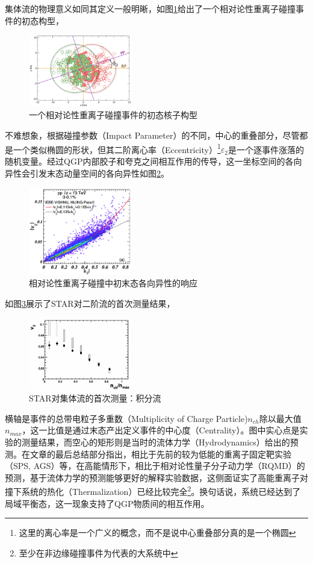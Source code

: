 \documentclass[%
 reprint,
 amsmath,amssymb,
 aps,
]{revtex4-1}
\begin{document}
集体流的物理意义如同其定义一般明晰，如图\ref{fig:Config}给出了一个相对论性重离子碰撞事件的初态构型，
\begin{figure}[htbp]
    \includegraphics[width=0.4\textwidth]{Plots/Config.png}
    \caption{\label{fig:Config}一个相对论性重离子碰撞事件的初态核子构型}
\end{figure}
不难想象，根据碰撞参数（Impact Parameter）的不同，中心的重叠部分，尽管都是一个类似椭圆的形状，但其二阶离心率（Eccentricity）\footnote{这里的离心率是一个广义的概念，而不是说中心重叠部分真的是一个椭圆}$\varepsilon_2$是一个逐事件涨落的随机变量。经过QGP内部胶子和夸克之间相互作用的传导，这一坐标空间的各向异性会引发末态动量空间的各向异性如图\ref{fig:v2e2}。
\begin{figure}[htbp]
    \includegraphics[width=0.4\textwidth]{Plots/v2e2.png}
    \caption{\label{fig:v2e2}相对论性重离子碰撞中初末态各向异性的响应}
\end{figure}

如图\ref{fig:v2}展示了STAR对二阶流的首次测量结果，
\begin{figure}[htbp]
    \includegraphics[width=0.4\textwidth]{Plots/v2.png}
    \caption{\label{fig:v2}STAR对集体流的首次测量：积分流}
\end{figure}
横轴是事件的总带电粒子多重数（Multiplicity of Charge Particle)$n_{ch}$除以最大值$n_{max}$，这一比值是通过末态产出定义事件的中心度（Centrality）。图中实心点是实验的测量结果，而空心的矩形则是当时的流体力学（Hydrodynamics）给出的预测。在文章的最后总结部分指出，相比于先前的较为低能的重离子固定靶实验（SPS, AGS）等，在高能情形下，相比于相对论性量子分子动力学（RQMD）的预测，基于流体力学的预测能够更好的解释实验数据，这侧面证实了高能重离子对撞下系统的热化（Thermalization）已经比较完全\footnote{至少在非边缘碰撞事件为代表的大系统中}。换句话说，系统已经达到了局域平衡态，这一现象支持了QGP物质间的相互作用。
\end{document}
